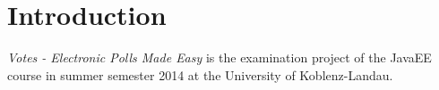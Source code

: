 \section{Introduction}
\textit{Votes - Electronic Polls Made Easy} is the examination project of the JavaEE course in summer semester 2014 at the University of Koblenz-Landau.
